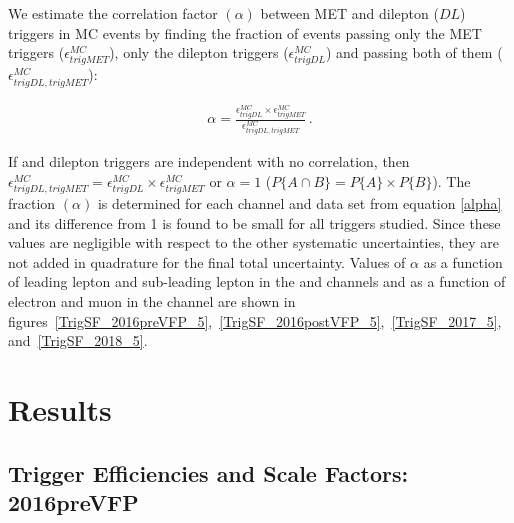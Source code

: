 We estimate the correlation factor $(\alpha)$ between MET and dilepton ($DL$) triggers in \ttbar MC events by finding the fraction of events passing only the MET triggers ($\epsilon_{trigMET}^{MC}$), only the dilepton triggers ($\epsilon_{trigDL}^{MC}$) and passing both of them ($\epsilon_{trigDL,trigMET}^{MC}$): 
\begin{linenomath*}
\begin{align}
\alpha=\frac{\epsilon_{trigDL}^{MC} \times \epsilon_{trigMET}^{MC}}{\epsilon_{trigDL,trigMET}^{MC}} \, .
\label{alpha}
\end{align}
\end{linenomath*}
If \MET and dilepton triggers are independent with no correlation, then $\epsilon_{trigDL,trigMET}^{MC} = \epsilon_{trigDL}^{MC} \times \epsilon_{trigMET}^{MC}$ or $\alpha = 1$ ($P\{A\cap B\} = P\{A\} \times P\{B\}$).
The fraction $(\alpha)$ is determined for each channel and data set from equation \ref{alpha} and its difference from 1 is found to be small for all triggers studied. 
Since these values are negligible with respect to the other systematic uncertainties, they are not added in quadrature for the final total uncertainty. 
Values of $\alpha$ as a function of leading lepton \pT and sub-leading lepton \pT in the \ee and \mumu channels and as a function of electron \pT and muon \pT in the \emu channel are shown in figures~\ref{TrigSF_2016preVFP_5},~\ref{TrigSF_2016postVFP_5},~\ref{TrigSF_2017_5}, and~\ref{TrigSF_2018_5}. 

\section{Results}

\subsection{Trigger Efficiencies and Scale Factors: 2016preVFP}
\label{TrigSFResults2016preVFP}

